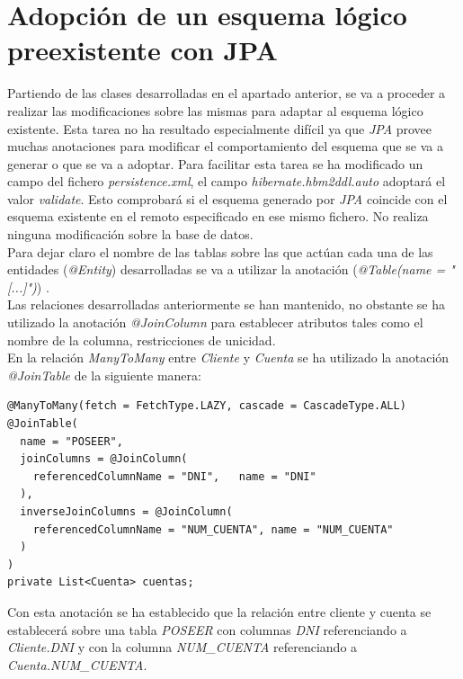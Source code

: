 \documentclass[11pt,a4paper]{article}
\begin{document}
\newpage
\section{Adopción de un esquema lógico preexistente con JPA}

Partiendo de las clases desarrolladas en el apartado anterior, se va a proceder a realizar las modificaciones sobre las mismas para adaptar al esquema lógico existente. Esta tarea no ha resultado especialmente difícil ya que \emph{JPA} provee muchas anotaciones para modificar el comportamiento del esquema que se va a generar o que se va a adoptar. Para facilitar esta tarea se ha modificado un campo del fichero \emph{persistence.xml}, el campo \emph{hibernate.hbm2ddl.auto} adoptará el valor \emph{validate}. Esto comprobará si el esquema generado por \emph{JPA} coincide con el esquema existente en el remoto especificado en ese mismo fichero. No realiza ninguna modificación sobre la base de datos.\\
Para dejar claro el nombre de las tablas sobre las que actúan cada una de las entidades (\emph{@Entity}) desarrolladas se va a utilizar la anotación (\emph{@Table(name = "[...]")}) .\\
Las relaciones desarrolladas anteriormente se han mantenido, no obstante se ha utilizado la anotación \emph{@JoinColumn} para establecer atributos tales como el nombre de la columna, restricciones de unicidad.\\
En la relación \emph{ManyToMany} entre \emph{Cliente} y \emph{Cuenta} se ha utilizado la anotación \emph{@JoinTable} de la siguiente manera:

\begin{lstlisting}
@ManyToMany(fetch = FetchType.LAZY, cascade = CascadeType.ALL)
@JoinTable(
  name = "POSEER",
  joinColumns = @JoinColumn(
    referencedColumnName = "DNI",	name = "DNI"
  ),
  inverseJoinColumns = @JoinColumn(
    referencedColumnName = "NUM_CUENTA", name = "NUM_CUENTA"
  )
)
private List<Cuenta> cuentas;
\end{lstlisting}

Con esta anotación se ha establecido que la relación entre cliente y cuenta se establecerá sobre una tabla \emph{POSEER} con columnas \emph{DNI} referenciando a \emph{Cliente.DNI} y con la columna \emph{NUM\_{}CUENTA} referenciando a \emph{Cuenta.NUM\_{}CUENTA}.\\
\end{document}
